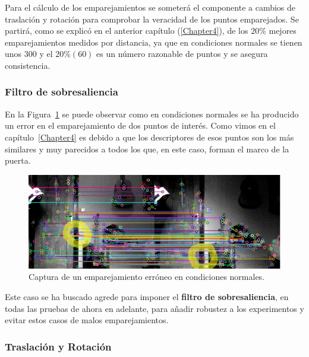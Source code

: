 Para el cálculo de los emparejamientos se someterá el componente a cambios de traslación y rotación para comprobar la veracidad de los puntos emparejados. Se partirá, como se explicó en el anterior capítulo (\ref{Chapter4}), de los $20\%$ mejores emparejamientos medidos por distancia, ya que en condiciones normales se tienen unos $300$ y el $20\% (60)$ es un número razonable de puntos y se asegura consistencia.

\subsubsection{Filtro de sobresaliencia}

En la Figura~\ref{fig:error-matching} se puede observar como en condiciones normales se ha producido un error en el emparejamiento de dos puntos de interés. Como vimos en el capítulo~\ref{Chapter4} es debido a que los descriptores de esos puntos son los más similares y muy parecidos a todos los que, en este caso, forman el marco de la puerta.


\begin{figure}[th]
\centering
\includegraphics[scale=0.6]{Figures/tests/matching-error.png}
\decoRule
\caption[Captura con un error de emparejamiento sin filtro de sobresaliencia]{Captura de un emparejamiento erróneo en condiciones normales.}
\label{fig:error-matching}
\end{figure}

Este caso se ha buscado agrede para imponer el \textbf{filtro de sobresaliencia}, en todas las pruebas de ahora en adelante, para añadir robustez a los experimentos y evitar estos casos de malos emparejamientos.

\subsubsection{Traslación y Rotación}

